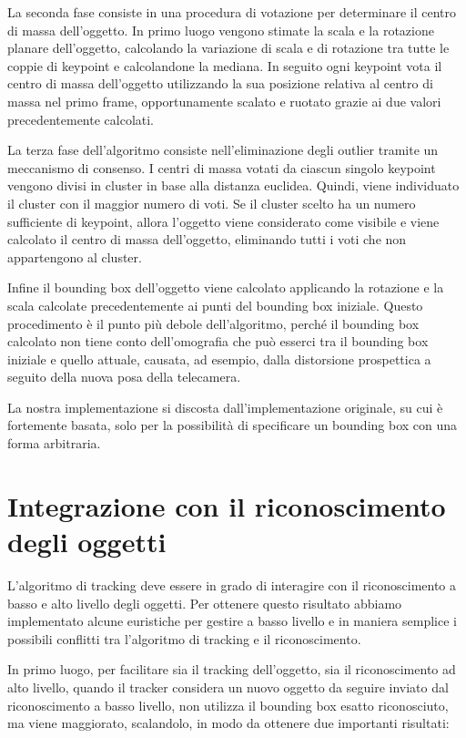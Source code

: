 La seconda fase consiste in una procedura di votazione per determinare il centro di massa dell'oggetto.
In primo luogo vengono stimate la scala e la rotazione planare dell'oggetto, calcolando la variazione di scala e di rotazione tra tutte le coppie di keypoint e calcolandone la mediana. In seguito ogni keypoint vota il centro di massa dell'oggetto utilizzando la sua posizione relativa al centro di massa nel primo frame, opportunamente scalato e ruotato grazie ai due valori precedentemente calcolati.

La terza fase dell'algoritmo consiste nell'eliminazione degli outlier tramite un meccanismo di consenso. I centri di massa votati da ciascun singolo keypoint vengono divisi in cluster in base alla distanza euclidea. Quindi, viene individuato il cluster con il maggior numero di voti. Se il cluster scelto ha un numero sufficiente di keypoint, allora l'oggetto viene considerato come visibile e viene calcolato il centro di massa dell'oggetto, eliminando tutti i voti che non appartengono al cluster.

Infine il bounding box dell'oggetto viene calcolato applicando la rotazione e la scala calcolate precedentemente ai punti del bounding box iniziale. Questo procedimento è il punto più debole dell'algoritmo, perché il bounding box calcolato non tiene conto dell'omografia che può esserci tra il bounding box iniziale e quello attuale, causata, ad esempio, dalla distorsione prospettica a seguito della nuova posa della telecamera.

La nostra implementazione si discosta dall'implementazione originale, su cui è fortemente basata, solo per la possibilità di specificare un bounding box con una forma arbitraria.

\section{Integrazione con il riconoscimento degli oggetti}

L'algoritmo di tracking deve essere in grado di interagire con il riconoscimento a basso e alto livello degli oggetti. Per ottenere questo risultato abbiamo implementato alcune euristiche per gestire a basso livello e in maniera semplice i possibili conflitti tra l'algoritmo di tracking e il riconoscimento.

In primo luogo, per facilitare sia il tracking dell'oggetto, sia il riconoscimento ad alto livello, quando il tracker considera un nuovo oggetto da seguire inviato dal riconoscimento a basso livello, non utilizza il bounding box esatto riconosciuto, ma viene maggiorato, scalandolo, in modo da ottenere due importanti risultati:

